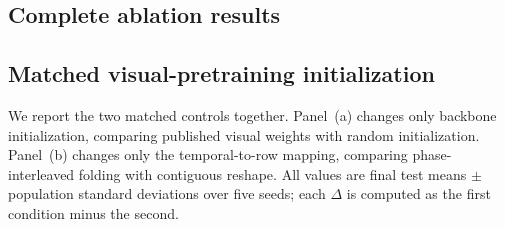 \subsection{Complete ablation results}\label{app:complete-ablations}

\subsection{Matched visual-pretraining initialization}\label{app:pretraining-full-generated}
We report the two matched controls together. Panel~(a) changes only backbone
initialization, comparing published visual weights with random initialization.
Panel~(b) changes only the temporal-to-row mapping, comparing phase-interleaved
folding with contiguous reshape. All values are final test means $\pm$
population standard deviations over five seeds; each $\Delta$ is computed as
the first condition minus the second.


